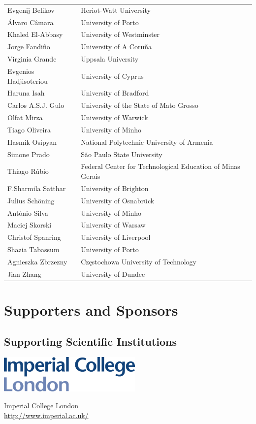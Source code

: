 \documentclass[a4paper,UKenglish]{oasicsmaster}
\begin{document}
\begin{tabularx}{\textwidth}{p{}l}
Evgenij Belikov		& Heriot-Watt University\\
\'{A}lvaro C\^{a}mara	& University of Porto\\
Khaled El-Abbasy	& University of Westminster\\
Jorge Fandi\~{n}o	& University of A Coru\~{n}a\\
Virginia Grande		& Uppsala University\\
Evgenios Hadjisoteriou 	& University of Cyprus\\
Haruna Isah		& University of Bradford\\
Carlos A.S.J. Gulo	& University of the State of Mato Grosso\\
Olfat Mirza		& University of Warwick\\
Tiago Oliveira		& University of Minho\\
Hasmik Osipyan		& National Polytechnic University of Armenia\\
Simone Prado		& S\~{a}o Paulo State University\\
Thiago R\'{u}bio	& Federal Center for Technological Education of Minas Gerais\\
F.Sharmila Satthar	& University of Brighton\\
Julius Sch\"{o}ning	& University of Osnabr\"{u}ck\\
Ant\'{o}nio Silva	& University of Minho\\
Maciej Skorski		& University of Warsaw\\
Christof Spanring 	& University of Liverpool\\
Shazia Tabassum		& University of Porto\\
Agnieszka Zbrzezny 	& Cz\k{e}stochowa University of Technology\\
Jian Zhang		& University of Dundee\\
\end{tabularx}

\chapter{Supporters and Sponsors}

\section*{Supporting Scientific Institutions}
\bigskip

\noindent
\begin{minipage}{0.6\textwidth}
  \begin{center}
  \includegraphics[height=5em]{imperial}
  \end{center}
\end{minipage}
\begin{minipage}{0.39\textwidth}
  Imperial College London\\
  \url{http://www.imperial.ac.uk/}
\end{minipage}
\end{document}
